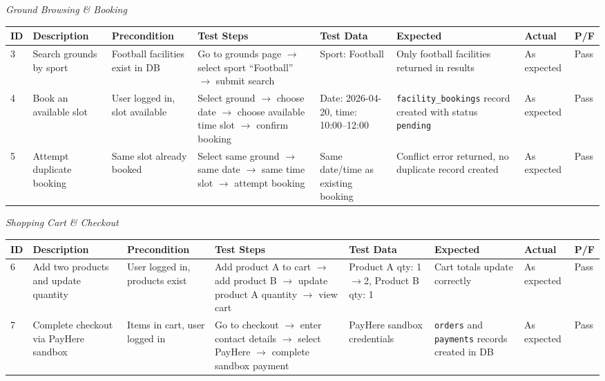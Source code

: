 \documentclass[12pt,a4paper]{report}
\begin{document}
\textit{Ground Browsing \& Booking}

\begin{center}
\footnotesize
\begin{longtable}{p{0.4cm} p{2.2cm} p{1.8cm} p{3.2cm} p{2.2cm} p{2.2cm} p{1.4cm} p{0.8cm}}
\toprule
\textbf{ID} & \textbf{Description} & \textbf{Precondition} & \textbf{Test Steps} & \textbf{Test Data} & \textbf{Expected} & \textbf{Actual} & \textbf{P/F}\\
\midrule
\endhead
3 & Search grounds by sport & Football facilities exist in DB & Go to grounds page $\to$ select sport ``Football'' $\to$ submit search & Sport: Football & Only football facilities returned in results & As expected & Pass\\[4pt]
4 & Book an available slot & User logged in, slot available & Select ground $\to$ choose date $\to$ choose available time slot $\to$ confirm booking & Date: 2026-04-20, time: 10:00--12:00 & \texttt{facility\_bookings} record created with status \texttt{pending} & As expected & Pass\\[4pt]
5 & Attempt duplicate booking & Same slot already booked & Select same ground $\to$ same date $\to$ same time slot $\to$ attempt booking & Same date/time as existing booking & Conflict error returned, no duplicate record created & As expected & Pass\\
\bottomrule
\end{longtable}
\end{center}

\textit{Shopping Cart \& Checkout}

\begin{center}
\footnotesize
\begin{longtable}{p{0.4cm} p{2.2cm} p{1.8cm} p{3.2cm} p{2.2cm} p{2.2cm} p{1.4cm} p{0.8cm}}
\toprule
\textbf{ID} & \textbf{Description} & \textbf{Precondition} & \textbf{Test Steps} & \textbf{Test Data} & \textbf{Expected} & \textbf{Actual} & \textbf{P/F}\\
\midrule
\endhead
6 & Add two products and update quantity & User logged in, products exist & Add product A to cart $\to$ add product B $\to$ update product A quantity $\to$ view cart & Product A qty: 1$\to$2, Product B qty: 1 & Cart totals update correctly & As expected & Pass\\[4pt]
7 & Complete checkout via PayHere sandbox & Items in cart, user logged in & Go to checkout $\to$ enter contact details $\to$ select PayHere $\to$ complete sandbox payment & PayHere sandbox credentials & \texttt{orders} and \texttt{payments} records created in DB & As expected & Pass\\
\bottomrule
\end{longtable}
\end{center}
\end{document}
